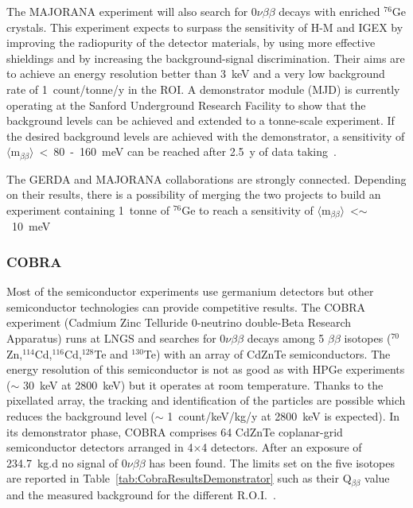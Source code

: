 \documentclass[main.tex]{subfiles}
\begin{document}
The MAJORANA experiment will also search for 0$\nu\beta\beta$ decays with enriched $^{\text{76}}$Ge crystals. This experiment expects to surpass the sensitivity of H-M and IGEX by improving the radiopurity of the detector materials, by using more effective shieldings and by increasing the background-signal discrimination. Their aims are to achieve an energy resolution better than 3~keV and a very low background rate of 1~count/tonne/y in the ROI. A demonstrator module (MJD) is currently operating at the Sanford Underground Research Facility to show that the background levels can be achieved and extended to a tonne-scale experiment. If the desired background levels are achieved with the demonstrator, a sensitivity of $\langle \text{m}_{\beta\beta} \rangle$~<~80~-~160~meV can be reached after 2.5~y of data taking~\cite{MAJORANA}.


\bigskip


\NI The GERDA and MAJORANA collaborations are strongly connected. Depending on their results, there is a possibility of merging the two projects to build an experiment containing 1~tonne of $^{\text{76}}$Ge to reach a sensitivity of $\langle \text{m}_{\beta\beta} \rangle$~<$\sim$~10~meV~\cite{MAJORANAandGERDA} \\

\subsubsection{COBRA}


\NI Most of the semiconductor experiments use germanium detectors but other semiconductor technologies can provide competitive results. The COBRA experiment (Cadmium Zinc Telluride 0-neutrino double-Beta Research Apparatus) runs at LNGS and searches for 0$\nu\beta\beta$ decays among 5 $\beta\beta$ isotopes ($^{\text{70}}$Zn,$^{\text{114}}$Cd,$^{\text{116}}$Cd,$^{\text{128}}$Te and $^{\text{130}}$Te) with an array of CdZnTe semiconductors. The energy resolution of this semiconductor is not as good as with HPGe experiments ($\sim$ 30~keV at 2800~keV) but it operates at room temperature. Thanks to the pixellated array, the tracking and identification of the particles are possible which reduces the background level ($\sim$ 1~count/keV/kg/y at 2800~keV is expected). In its demonstrator phase, COBRA comprises 64 CdZnTe coplanar-grid semiconductor detectors arranged in 4$\times$4 detectors. After an exposure of 234.7~kg.d no signal of 0$\nu\beta\beta$ has been found. The limits set on the five isotopes are reported in Table~\ref{tab:CobraResultsDemonstrator} such as their Q$_{\beta\beta}$ value and the measured background for the different R.O.I.~\cite{CobraDemonstrator}.
\end{document}
